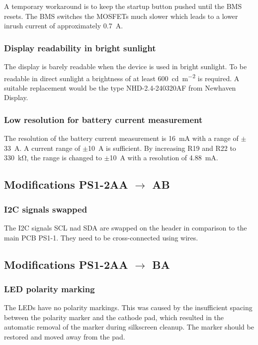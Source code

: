 A temporary workaround is to keep the startup button pushed until the BMS resets. The BMS switches the \acp{MOSFET} much slower which leads to a lower inrush current of approximately \qty{0.7}{\ampere}. 


\subsubsection{Display readability in bright sunlight}
The display is barely readable when the device is used in bright sunlight. To be readable in direct sunlight a brightness of at least \qty{600}{\candela\per\square\meter} is required. A suitable replacement would be the type NHD-2.4-240320AF from Newhaven Display. 

\subsubsection{Low resolution for battery current measurement}
The resolution of the battery current measurement is \qty{16}{\milli\ampere} with a range of $\pm$\qty{33}{\ampere}. A current range of $\pm$\qty{10}{\ampere} is sufficient. By increasing R19 and R22 to \qty{330}{\kilo\ohm}, the range is changed to $\pm$\qty{10}{\ampere} with a resolution of \qty{4.88}{\milli\ampere}. 

\subsection{Modifications PS1-2AA $\to$ AB}

\subsubsection{\acs{I2C} signals swapped}
The \ac{I2C} signals SCL nad SDA are swapped on the header in comparison to the main PCB PS1-1. They need to be cross-connected using wires. 

\subsection{Modifications PS1-2AA $\to$ BA}

\subsubsection{LED polarity marking}
The LEDs have no polarity markings. This was caused by the insufficient spacing between the polarity marker and the cathode pad, which resulted in the automatic removal of the marker during silkscreen cleanup. The marker should be restored and moved away from the pad. 

